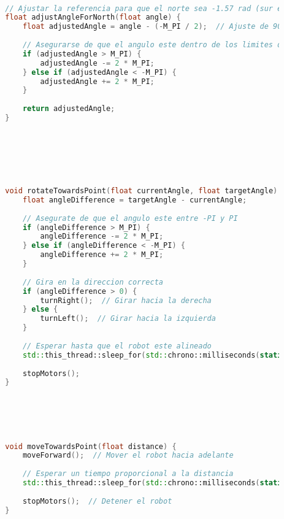 \begin{lstlisting}[language={C++}, caption={Primer ajuste de c\'odigo}, label={Script}]
        
        
        
        
        // Ajustar la referencia para que el norte sea -1.57 rad (sur en coordenadas cartesianas es 0 rad)
        float adjustAngleForNorth(float angle) {
            float adjustedAngle = angle - (-M_PI / 2);  // Ajuste de 90 (norte en -90)
            
            // Asegurarse de que el angulo este dentro de los limites de -PI a PI
            if (adjustedAngle > M_PI) {
                adjustedAngle -= 2 * M_PI;
            } else if (adjustedAngle < -M_PI) {
                adjustedAngle += 2 * M_PI;
            }
            
            return adjustedAngle;
        }
        
        
        
        
        
        
        
        void rotateTowardsPoint(float currentAngle, float targetAngle) {
            float angleDifference = targetAngle - currentAngle;
        
            // Asegurate de que el angulo este entre -PI y PI
            if (angleDifference > M_PI) {
                angleDifference -= 2 * M_PI;
            } else if (angleDifference < -M_PI) {
                angleDifference += 2 * M_PI;
            }
        
            // Gira en la direccion correcta
            if (angleDifference > 0) {
                turnRight();  // Girar hacia la derecha
            } else {
                turnLeft();  // Girar hacia la izquierda
            }
        
            // Esperar hasta que el robot este alineado
            std::this_thread::sleep_for(std::chrono::milliseconds(static_cast<int>(std::fabs(angleDifference) * 1000)));
            
            stopMotors();
        }
        
        
        
        
        
        
        void moveTowardsPoint(float distance) {
            moveForward();  // Mover el robot hacia adelante
        
            // Esperar un tiempo proporcional a la distancia
            std::this_thread::sleep_for(std::chrono::milliseconds(static_cast<int>(distance * 1000)));
            
            stopMotors();  // Detener el robot
        }
        

\end{lstlisting}
